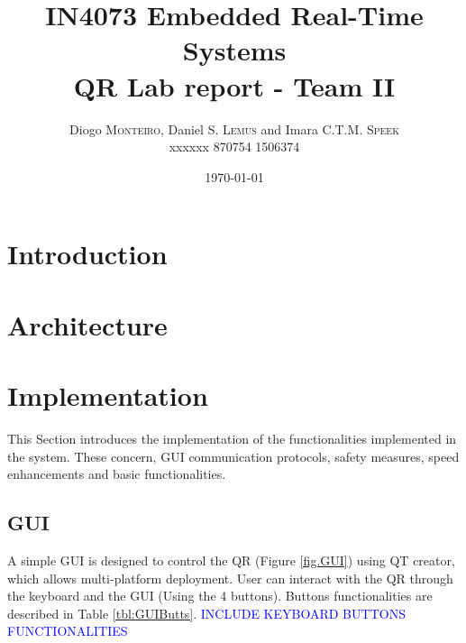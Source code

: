 \documentclass{article}
\title{IN4073 Embedded Real-Time Systems \\ QR Lab report - Team II} %
\author{Diogo \textsc{Monteiro}, Daniel S. \textsc{Lemus} and Imara C.T.M. \textsc{Speek} \\
		xxxxxx 870754 1506374} %
\date{\today} %
\newcommand\todo[1]{\textcolor{blue}{#1}} %
\begin{document}
\maketitle %

 \begin{abstract}


 \end{abstract}


\section{Introduction}
\label{sec:introduction}



\section{Architecture}
\label{sec:architecture}





\section{Implementation}
\label{sec:implementation}

This Section introduces the implementation of the functionalities implemented in the system. These concern, GUI communication protocols, safety measures, speed enhancements and basic functionalities.


\subsection{GUI}
A simple GUI is designed to control the QR (Figure \ref{fig.GUI}) using QT creator, which allows multi-platform deployment. User can interact with the QR through the keyboard and the GUI (Using the 4 buttons). Buttons functionalities are described in Table \ref{tbl:GUIButts}. \todo{INCLUDE KEYBOARD BUTTONS FUNCTIONALITIES}
\end{document}
